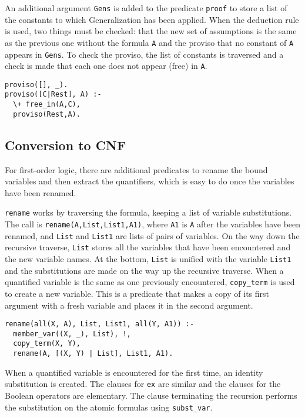 \documentclass[11pt]{article}
\newcommand*{\p}[1]{\textup{\texttt{#1}}}
\begin{document}
An additional argument \p{Gens} is added to the predicate \p{proof} to
store a list of the constants to which Generalization has been applied.
When the deduction rule is used, two things must be checked: that the
new set of assumptions is the same as the previous one without the
formula \p{A} and the proviso that no constant of \p{A} appears in
\p{Gens}. To check the proviso, the list of constants is traversed and a
check is made that each one does not appear (free) in \p{A}.

\begin{verbatim}
proviso([], _).
proviso([C|Rest], A) :-
  \+ free_in(A,C),
  proviso(Rest,A).
\end{verbatim}




\subsection{Conversion to CNF}

For first-order logic, there are additional predicates to rename the
bound variables and then extract the quantifiers, which is easy to do
once the variables have been renamed.

\p{rename} works by traversing the formula, keeping a list of variable
substitutions. The call is \p{rename(A,List,List1,A1)}, where \p{A1} is
\p{A} after the variables have been renamed, and \p{List} and \p{List1}
are lists of pairs of variables. On the way down the recursive traverse,
\p{List} stores all the variables that have been encountered and the new
variable names. At the bottom, \p{List} is unified with the variable
\p{List1} and the substitutions are made on the way up the recursive
traverse. When a quantified variable is the same as one previously
encountered, \p{copy\_term} is used to create a new variable. This is a
predicate that makes a copy of its first argument with a fresh variable
and places it in the second argument.

\begin{verbatim}
rename(all(X, A), List, List1, all(Y, A1)) :-
  member_var((X, _), List), !,
  copy_term(X, Y),
  rename(A, [(X, Y) | List], List1, A1).
\end{verbatim}

When a quantified variable is encountered for the first time, an
identity substitution is created. The clauses for \p{ex} are similar and
the clauses for the Boolean operators are elementary. The clause
terminating the recursion performs the substitution on the atomic
formulas using \p{subst\_var}.
\end{document}
